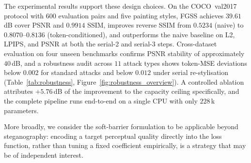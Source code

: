 \documentclass[runningheads]{llncs}
\begin{document}
The experimental results support these design choices. On the COCO~val2017 protocol with $600$ evaluation pairs and five painting styles, FGSS achieves $39.61$\,dB cover PSNR and $0.9914$ SSIM, improves reverse SSIM from $0.5234$ (naive) to $0.8070$--$0.8136$ (token-conditioned), and outperforms the naive baseline on L2, LPIPS, and PSNR at both the serial-2 and serial-3 steps. Cross-dataset evaluation on four unseen benchmarks confirms PSNR stability of approximately $40$\,dB, and a robustness audit across $11$ attack types shows token-MSE deviations below $0.002$ for standard attacks and below $0.012$ under serial re-stylisation (Table~\ref{tab:robustness}, Figure~\ref{fig:robustness_overview}). A controlled ablation attributes $+5.76$\,dB of the improvement to the capacity ceiling specifically, and the complete pipeline runs end-to-end on a single CPU with only $228$\,k parameters.

More broadly, we consider the soft-barrier formulation to be applicable beyond steganography: encoding a target perceptual quality directly into the loss function, rather than tuning a fixed coefficient empirically, is a strategy that may be of independent interest.
\end{document}
